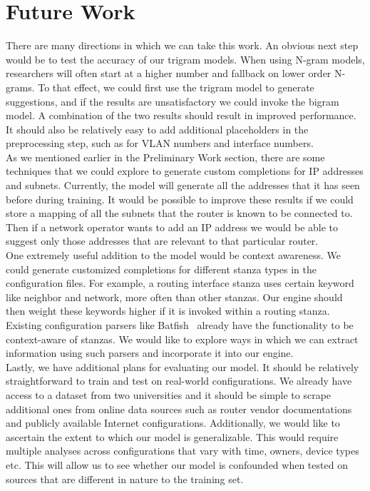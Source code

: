 \section{Future Work}
There are many directions in which we can take this work. An obvious next step would be to test the accuracy of our trigram models. When using N-gram models, researchers will often start at a higher number and fallback on lower order N-grams. To that effect, we could first use the trigram model to generate suggestions, and if the results are unsatisfactory we could invoke the bigram model. A combination of the two results should result in improved performance. It should also be relatively easy to add additional placeholders in the preprocessing step, such as for VLAN numbers and interface numbers.\\

As we mentioned earlier in the Preliminary Work section, there are some techniques that we could explore to generate custom completions for IP addresses and subnets. Currently, the model will generate all the addresses that it has seen before during training. It would be possible to improve these results if we could store a mapping of all the subnets that the router is known to be connected to. Then if a network operator wants to add an IP address we would be able to suggest only those addresses that are relevant to that particular router.\\

One extremely useful addition to the model would be context awareness. We could generate customized completions for different stanza types in the configuration files. For example, a routing interface stanza uses certain keyword like neighbor and network, more often than other stanzas. Our engine should then weight these keywords higher if it is invoked within a routing stanza. Existing configuration parsers like Batfish~\cite{batfish} already have the functionality to be context-aware of stanzas. We would like to explore ways in which we can extract information using such parsers and incorporate it into our engine.\\ 

Lastly, we have additional plans for evaluating our model. It should be relatively straightforward to train and test on real-world configurations. We already have access to a dataset from two universities and it should be simple to scrape additional ones from online data sources such as router vendor documentations and publicly available Internet configurations. Additionally, we would like to ascertain the extent to which our model is generalizable. This would require multiple analyses across configurations that vary with time, owners, device types etc. This will allow us to see whether our model is confounded when tested on sources that are different in nature to the training set. 